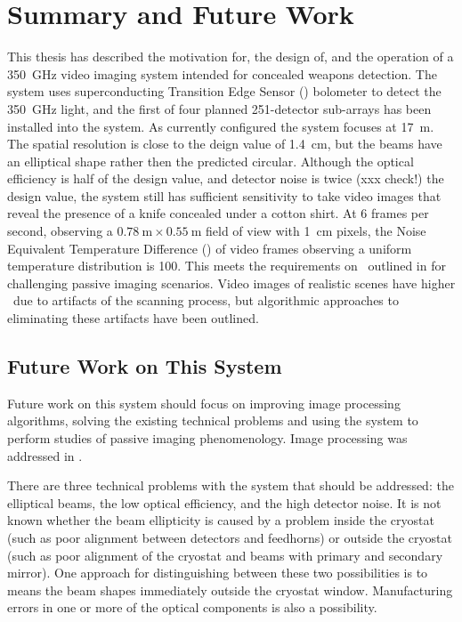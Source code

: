 \chapter{Summary and Future Work} \label{c:summary}

This thesis has described the motivation for, the design of, and the operation of a \SI{350}{\GHz} video imaging system intended for concealed weapons detection.
The system uses superconducting Transition Edge Sensor (\TES) bolometer to detect the \SI{350}{\GHz} light, and the first of four planned 251-detector sub-arrays has been installed into the system.
As currently configured the system focuses at \SI{17}{\m}.
The spatial resolution is close to the deign value of \SI{1.4}{\cm}, but the beams have an elliptical shape rather then the predicted circular.
Although the optical efficiency is half of the design value, and detector noise is twice (xxx check!) the design value, the system still has sufficient sensitivity to take video images that reveal the presence of a knife concealed under a cotton shirt.
At 6 frames per second, observing a $\SI{0.78}{\m} \times \SI{0.55}{\m}$ field of view with \SI{1}{\cm} pixels, the Noise Equivalent Temperature Difference (\NETD) of video frames observing a uniform temperature distribution is \SI{100}{\mK}.
This meets the requirements on \NETD\ outlined in  for challenging passive imaging scenarios.
Video images of realistic scenes have higher \NETD\ due to artifacts of the scanning process, but algorithmic approaches to eliminating these artifacts have been outlined.

\section{Future Work on This System}

Future work on this system should focus on improving image processing algorithms, solving the existing technical problems and using the system to perform studies of passive imaging phenomenology.
Image processing was addressed in .

There are three technical problems with the system that should be addressed: the elliptical beams, the low optical efficiency, and the high detector noise.
It is not known whether the beam ellipticity is caused by a problem inside the cryostat (such as poor alignment between detectors and feedhorns) or outside the cryostat (such as poor alignment of the cryostat and beams with primary and secondary mirror).
One approach for distinguishing between these two possibilities is to means the beam shapes immediately outside the cryostat window.
Manufacturing errors in one or more of the optical components is also a possibility.

